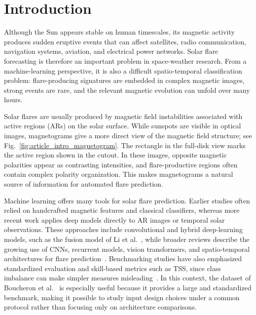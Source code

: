 \section{Introduction}

Although the Sun appears stable on human timescales, its magnetic activity produces sudden eruptive events that can affect satellites, radio communication, navigation systems, aviation, and electrical power networks. Solar flare forecasting is therefore an important problem in space-weather research. From a machine-learning perspective, it is also a difficult spatio-temporal classification problem: flare-producing signatures are embedded in complex magnetic images, strong events are rare, and the relevant magnetic evolution can unfold over many hours.

Solar flares are usually produced by magnetic field instabilities associated with active regions (ARs) on the solar surface. While sunspots are visible in optical images, magnetograms give a more direct view of the magnetic field structure; see Fig.~\ref{fig:article_intro_magnetogram}. The rectangle in the full-disk view marks the active region shown in the cutout. In these images, opposite magnetic polarities appear as contrasting intensities, and flare-productive regions often contain complex polarity organization. This makes magnetograms a natural source of information for automated flare prediction.

Machine learning offers many tools for solar flare prediction. Earlier studies often relied on handcrafted magnetic features and classical classifiers, whereas more recent work applies deep models directly to AR images or temporal solar observations. These approaches include convolutional and hybrid deep-learning models, such as the fusion model of Li et al.~\cite{ref_li_flares}, while broader reviews describe the growing use of CNNs, recurrent models, vision transformers, and spatio-temporal architectures for flare prediction~\cite{ref_shao_review}. Benchmarking studies have also emphasized standardized evaluation and skill-based metrics such as TSS, since class imbalance can make simpler measures misleading~\cite{ref_bloomfield}. In this context, the dataset of Boucheron et al.~\cite{ref_boucheron} is especially useful because it provides a large and standardized benchmark, making it possible to study input design choices under a common protocol rather than focusing only on architecture comparisons.

